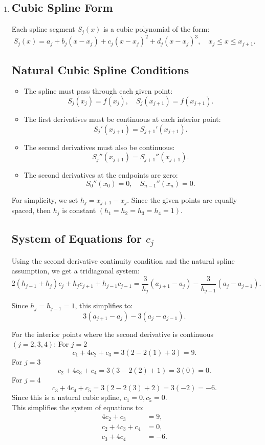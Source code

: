 \documentclass[12pt]{article}
\begin{document}
\begin{enumerate}[leftmargin=2em]
    \item
\subsection*{Cubic Spline Form}  
Each spline segment \( S_j(x) \) is a cubic polynomial of the form:
\[
S_j(x) = a_j + b_j (x - x_j) + c_j (x - x_j)^2 + d_j (x - x_j)^3, \quad x_j \leq x \leq x_{j+1}.
\]

\subsection*{Natural Cubic Spline Conditions}  
\begin{itemize}
    \item The spline must pass through each given point:
    \[
    S_j(x_j) = f(x_j), \quad S_j(x_{j+1}) = f(x_{j+1}).
    \]
   
    \item The first derivatives must be continuous at each interior point:
    \[
    S_j'(x_{j+1}) = S_{j+1}'(x_{j+1}).
    \]
    \item The second derivatives must also be continuous:
    \[
    S_j''(x_{j+1}) = S_{j+1}''(x_{j+1}).
    \]
    \item The second derivatives at the endpoints are zero:
    \[
    S_0''(x_0) = 0, \quad S_{n-1}''(x_n) = 0.
    \]
\end{itemize}

For simplicity, we set $h_j = x_{j+1} - x_j.$
Since the given points are equally spaced, then \( h_j \) is constant $(h_1=h_2=h_3=h_4 = 1)$.\\

\subsection*{System of Equations for \( c_j \)}  
Using the second derivative continuity condition and the natural spline assumption, we get a tridiagonal system:
\[
2(h_{j-1} + h_j)c_j + h_j c_{j+1} + h_{j-1} c_{j-1} = \frac{3}{h_j}(a_{j+1} - a_j) - \frac{3}{h_{j-1}}(a_j - a_{j-1}).
\]

Since $h_j = h_{j-1} = 1$, this simplifies to:
\[
3(a_{j+1} - a_j) - 3(a_j - a_{j-1}).
\]

For the interior points where the second derivative is continuous $(j=2,3,4)$:
For $j=2$
\[
c_1+4c_2+c_3 = 3(2-2(1)+3)=9.
\]
For $j=3$
\[
c_2+4c_3+c_4=3(3-2(2)+1)=3(0)=0.
\]
For $j=4$
\[
c_3+4c_4+c_5=3(2-2(3)+2)=3(-2)=-6.
\]
Since this is a natural cubic spline, $c_1=0,c_5=0.$\\
This simplifies the system of equations to:
\begin{align*}
4c_2 + c_3 &= 9, \\
c_2 + 4c_3 + c_4 &= 0, \\
c_3 + 4c_4 &= -6.
\end{align*}


\end{enumerate}
\end{document}
